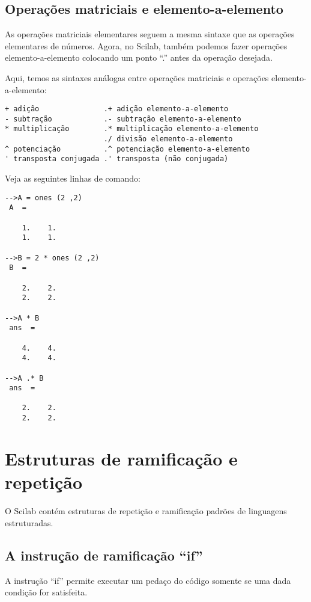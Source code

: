 \documentclass[main.tex]{subfiles}
\begin{document}
\subsection{Operações matriciais e elemento-a-elemento}

As operações matriciais elementares seguem a mesma sintaxe que as operações elementares de números. Agora, no Scilab, também podemos fazer operações elemento-a-elemento colocando um ponto ``.'' antes da operação desejada.

Aqui, temos as sintaxes análogas entre operações matriciais e operações elemento-a-elemento:
\begin{verbatim}
+ adição               .+ adição elemento-a-elemento
- subtração            .- subtração elemento-a-elemento
* multiplicação        .* multiplicação elemento-a-elemento
                       ./ divisão elemento-a-elemento
^ potenciação          .^ potenciação elemento-a-elemento
' transposta conjugada .' transposta (não conjugada)
\end{verbatim}

\begin{ex}
  Veja as seguintes linhas de comando:
\begin{verbatim}
-->A = ones (2 ,2)
 A  =
 
    1.    1.  
    1.    1.  
 
-->B = 2 * ones (2 ,2)
 B  =
 
    2.    2.  
    2.    2.  
 
-->A * B
 ans  =
 
    4.    4.  
    4.    4.  
 
-->A .* B
 ans  =
 
    2.    2.  
    2.    2.  
\end{verbatim}
\end{ex}

\section{Estruturas de ramificação e repetição}

O Scilab contém estruturas de repetição e ramificação padrões de linguagens estruturadas.

\subsection{A instrução de ramificação ``if''}

A instrução ``if'' permite executar um pedaço do código somente se uma dada condição for satisfeita.
\end{document}
